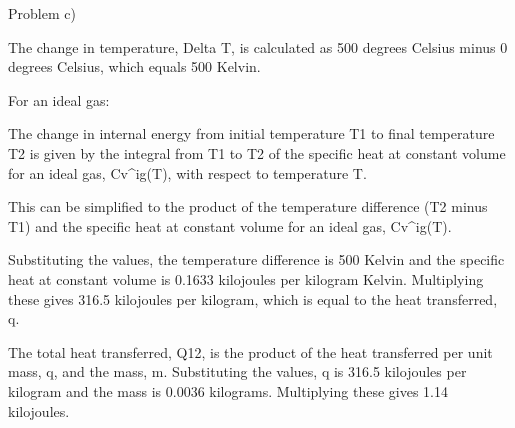Problem c)

The change in temperature, Delta T, is calculated as 500 degrees Celsius minus 0 degrees Celsius, which equals 500 Kelvin.

For an ideal gas:

The change in internal energy from initial temperature T1 to final temperature T2 is given by the integral from T1 to T2 of the specific heat at constant volume for an ideal gas, Cv^ig(T), with respect to temperature T.

This can be simplified to the product of the temperature difference (T2 minus T1) and the specific heat at constant volume for an ideal gas, Cv^ig(T).

Substituting the values, the temperature difference is 500 Kelvin and the specific heat at constant volume is 0.1633 kilojoules per kilogram Kelvin. Multiplying these gives 316.5 kilojoules per kilogram, which is equal to the heat transferred, q.

The total heat transferred, Q12, is the product of the heat transferred per unit mass, q, and the mass, m. Substituting the values, q is 316.5 kilojoules per kilogram and the mass is 0.0036 kilograms. Multiplying these gives 1.14 kilojoules.